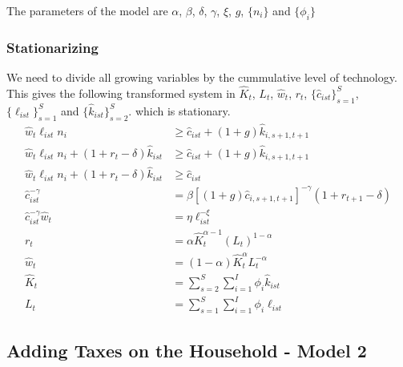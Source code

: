\documentclass[letterpaper,12pt]{article}
\theoremstyle{definition}
\numberwithin{equation}{section}
\begin{document}
\begin{spacing}{1.5}
      The parameters of the model are $\alpha$, $\beta$, $\delta$, $\gamma$, $\xi$, $g$, $\{n_i\}$ and $\{\phi_i\}$
      
      \subsubsection{Stationarizing}
      We need to divide all growing variables by the cummulative level of technology.  This gives the following transformed system in $\hat K_t$, $L_t$, $\hat w_t$, $r_t$, $\{\hat c_{ist}\}_{s=1}^S$, $\{\ell_{ist}\}_{s=1}^S$ and $\{\hat k_{ist}\}_{s=2}^S$. which is stationary.
      \begin{align}
      \hat w_t \ell_{ist} n_i & \ge \hat c_{ist} + (1+g) \hat k_{i,s+1,t+1} \label{Macro_Base_BC1_stat}\\
      \hat w_t \ell_{ist} n_i + (1+r_t-\delta)\hat k_{ist} & \ge \hat c_{ist} + (1+g) \hat k_{i,s+1,t+1} \label{Macro_Base_BC2_stat}\\
      \hat w_t \ell_{ist} n_i + (1+r_t-\delta)\hat k_{ist} & \ge \hat c_{ist} \label{Macro_Base_BC3_stat} \\
      \hat c_{ist}^{-\gamma} & = \beta [(1+g) \hat c_{i,s+1,t+1}]^{-\gamma}(1+r_{t+1}-\delta) \label{Macro_Base_Euler1_stat}\\
      \hat c_{ist}^{-\gamma} \hat w_t & = \eta \ell_{ist}^{-\xi} \label{Macro_Base_Euler2_stat} \\
      r_t & = \alpha \hat K_t^{\alpha-1}(L_t)^{1-\alpha} \label{Macro_Base_FirmFOC1_stat}\\
      \hat w_t & = (1-\alpha) \hat K_t^{\alpha}L_t^{-\alpha} \label{Macro_Base_FirmFOC2_stat} \\
      \hat K_t & = \sum_{s=2}^S \sum_{i=1}^I \phi_i \hat k_{ist} \label{Macro_Base_Clear1_stat}\\
      L_t & = \sum_{s=1}^S \sum_{i=1}^I \phi_i \ell_{ist} \label{Macro_Base_Clear2_stat}      
      \end{align}

    \newpage

  \subsection{Adding Taxes on the Household - Model 2}\label{SubSec_Macro_HHTax}

\end{spacing}
\end{document}
